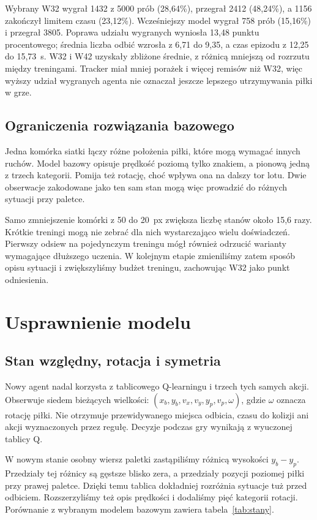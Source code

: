 \documentclass[11pt,a4paper]{article}
\begin{document}
Wybrany W32 wygrał 1432 z 5000 prób (28,64\%),
przegrał 2412 (48,24\%), a 1156 zakończył limitem czasu (23,12\%).
Wcześniejszy model wygrał 758 prób (15,16\%) i przegrał 3805.
Poprawa udziału wygranych wyniosła 13,48 punktu procentowego;
średnia liczba odbić wzrosła z 6,71 do 9,35, a czas epizodu
z 12,25 do 15,73~s. W32 i W42 uzyskały zbliżone średnie,
z różnicą mniejszą od rozrzutu między treningami. Tracker miał mniej
porażek i więcej remisów niż W32, więc wyższy udział wygranych
agenta nie oznaczał jeszcze lepszego utrzymywania piłki w grze.

\subsection{Ograniczenia rozwiązania bazowego}

Jedna komórka siatki łączy różne położenia piłki, które mogą wymagać
innych ruchów. Model bazowy opisuje prędkość poziomą tylko znakiem,
a pionową jedną z trzech kategorii. Pomija też rotację, choć wpływa
ona na dalszy tor lotu. Dwie obserwacje zakodowane jako ten sam stan
mogą więc prowadzić do różnych sytuacji przy paletce.

Samo zmniejszenie komórki z 50 do 20~px zwiększa liczbę stanów
około 15,6 razy. Krótkie treningi mogą nie zebrać dla nich wystarczająco
wielu doświadczeń. Pierwszy odsiew na pojedynczym treningu mógł również
odrzucić warianty wymagające dłuższego uczenia. W kolejnym etapie
zmieniliśmy zatem sposób opisu sytuacji i zwiększyliśmy budżet treningu,
zachowując W32 jako punkt odniesienia.

\section{Usprawnienie modelu}
\label{sec:usprawnienia}

\subsection{Stan względny, rotacja i symetria}

Nowy agent nadal korzysta z tablicowego Q-learningu i trzech tych
samych akcji. Obserwuje siedem bieżących wielkości:
$(x_b,y_b,v_x,v_y,y_p,v_p,\omega)$, gdzie $\omega$ oznacza rotację
piłki. Nie otrzymuje przewidywanego miejsca odbicia, czasu do kolizji
ani akcji wyznaczonych przez regułę. Decyzje podczas gry wynikają
z wyuczonej tablicy Q.

W nowym stanie osobny wiersz paletki zastąpiliśmy
różnicą wysokości $y_b-y_p$. Przedziały tej różnicy są gęstsze blisko
zera, a przedziały pozycji poziomej piłki przy prawej paletce.
Dzięki temu tablica dokładniej rozróżnia sytuacje tuż przed odbiciem.
Rozszerzyliśmy też opis prędkości i dodaliśmy pięć kategorii rotacji.
Porównanie z wybranym modelem bazowym zawiera tabela~\ref{tab:stany}.
\end{document}
